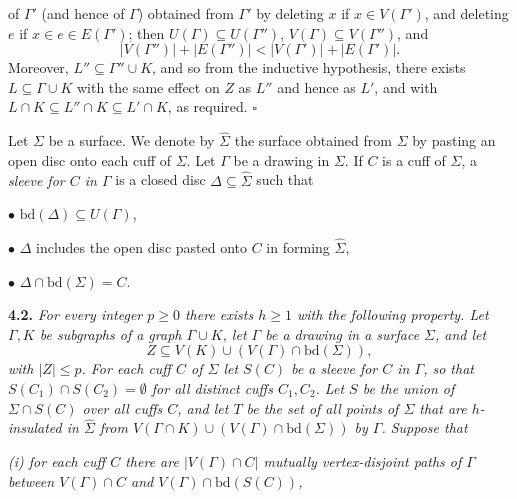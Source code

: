 \noindent of $\Gamma'$ (and hence of $\Gamma$) obtained from $\Gamma'$ by deleting $x$ if $x \in V(\Gamma')$, and deleting $e$ if $x \in e \in E(\Gamma')$; then $U(\Gamma) \subseteq U(\Gamma'')$, $V(\Gamma) \subseteq V(\Gamma'')$, and
\begin{equation*}
|V(\Gamma'')| + |E(\Gamma'')| < |V(\Gamma')| + |E(\Gamma')|.
\end{equation*}
Moreover, $L'' \subseteq \Gamma'' \cup K$, and so from the inductive hypothesis, there exists $L \subseteq \Gamma \cup K$ with the same effect on $Z$ as $L''$ and hence as $L'$, and with $L \cap K \subseteq L'' \cap K \subseteq L' \cap K$, as required. $\square$

Let $\Sigma$ be a surface. We denote by $\hat{\Sigma}$ the surface obtained from $\Sigma$ by pasting an open disc onto each cuff of $\Sigma$. Let $\Gamma$ be a drawing in $\Sigma$. If $C$ is a cuff of $\Sigma$, a \textit{sleeve for $C$ in $\Gamma$} is a closed disc $\Delta \subseteq \hat{\Sigma}$ such that

\hspace*{12pt}$\bullet$ $\text{bd}(\Delta) \subseteq U(\Gamma)$,

\hspace*{12pt}$\bullet$ $\Delta$ includes the open disc pasted onto $C$ in forming $\hat{\Sigma}$,

\hspace*{12pt}$\bullet$ $\Delta \cap \text{bd}(\Sigma) = C$.

\textbf{4.2.} \textit{For every integer $p \ge 0$ there exists $h \ge 1$ with the following property. Let $\Gamma, K$ be subgraphs of a graph $\Gamma \cup K$, let $\Gamma$ be a drawing in a surface $\Sigma$, and let}
\begin{equation*}
Z \subseteq V(K) \cup (V(\Gamma) \cap \text{bd}(\Sigma)),
\end{equation*}
\textit{with $|Z| \le p$. For each cuff $C$ of $\Sigma$ let $S(C)$ be a sleeve for $C$ in $\Gamma$, so that $S(C_1) \cap S(C_2) = \emptyset$ for all distinct cuffs $C_1, C_2$. Let $S$ be the union of $\Sigma \cap S(C)$ over all cuffs $C$, and let $T$ be the set of all points of $\Sigma$ that are $h$-insulated in $\hat{\Sigma}$ from $V(\Gamma \cap K) \cup (V(\Gamma) \cap \text{bd}(\Sigma))$ by $\Gamma$. Suppose that}

\textit{(i) for each cuff $C$ there are $|V(\Gamma) \cap C|$ mutually vertex-disjoint paths of $\Gamma$ between $V(\Gamma) \cap C$ and $V(\Gamma) \cap \text{bd}(S(C))$,}

